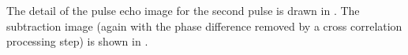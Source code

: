 The detail of the pulse echo image for the second pulse is drawn in .
The subtraction image (again with the phase difference removed by a cross correlation processing step)
is shown in .



